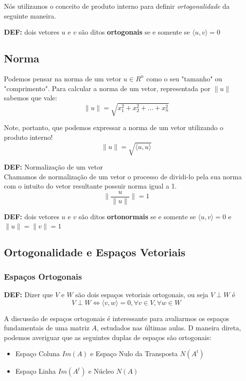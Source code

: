 \documentclass[12pt]{article}
\begin{document}
Nós utilizamos o conceito de produto interno para definir \textit{ortogonalidade} da seguinte maneira.

\textbf{DEF:} dois vetores $u$ e $v$ são ditos \textbf{ortogonais} se e somente se $\langle u,v \rangle=0$

\subsection{Norma}
Podemos pensar na norma de um vetor $u\in R^{n}$ como o seu "tamanho" ou "comprimento". Para calcular a norma de um vetor, representada por $\lVert u \rVert$ sabemos que vale:
\begin{equation*}
	\lVert u \rVert=\sqrt{x_{1}^{2}+x_{2}^{2}+...+x_{n}^{2}}
\end{equation*}

Note, portanto, que podemos expressar a norma de um vetor utilizando o produto interno!
\begin{equation*}
	\lVert u \rVert=\sqrt{\langle u,u \rangle}
\end{equation*}

\textbf{DEF:} Normalização de um vetor\\ Chamamos de normalização de um vetor o processo de dividi-lo pela sua norma com o intuito do vetor resultante possuir norma igual a 1.
\begin{equation*}
	\lVert \dfrac{u}{\lVert u \rVert}\rVert=1
\end{equation*}

\textbf{DEF:} dois vetores $u$ e $v$ são ditos \textbf{ortonormais} se e somente se $\langle u,v \rangle=0$ e $\lVert u \rVert=\lVert v \rVert=1$

\subsection{Ortogonalidade e Espaços Vetoriais}

\subsubsection{Espaços Ortogonais}
\textbf{DEF:} Dizer que $V$ e $W$ são dois espaços vetoriais ortogonais, ou seja $V\perp W$ é
\begin{equation*}
	V\perp W\iff \langle v,w \rangle=0, \forall v\in V,\forall w\in W
\end{equation*}

A discussão de espaços ortogonais é interessante para avaliarmos os espaços fundamentais de uma matriz $A$, estudados nas últimas aulas. D maneira direta, podemos averiguar que as seguintes duplas de espaços são ortogonais:
\begin{itemize}
	\item Espaço Coluna $Im(A)$ e Espaço Nulo da Transposta $N(A^{t})$
	\item Espaço Linha $Im(A^{t})$ e Núcleo $N(A)$
\end{itemize}
\end{document}
